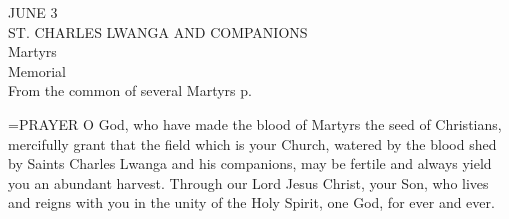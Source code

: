 \begin{center}\normalsize JUNE 3\\
\footnotesize ST. CHARLES LWANGA AND COMPANIONS\\
\footnotesize Martyrs\\
\footnotesize Memorial\\
\footnotesize From the common of several Martyrs p. \\
\end{center}

\hangindent=\parindent \small{PRAYER 
O God, who have made the blood of Martyrs
the seed of Christians,
mercifully grant that the field which is your Church,
watered by the blood
shed by Saints Charles Lwanga and his companions,
may be fertile and always yield you an abundant harvest.
Through our Lord Jesus Christ, your Son,
who lives and reigns with you in the unity of the Holy Spirit,
one God, for ever and ever.\\}
 
